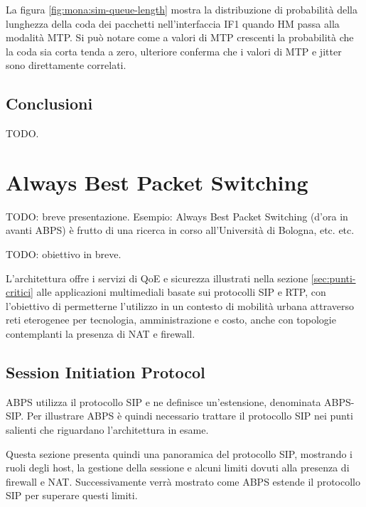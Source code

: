 \documentclass[12pt,a4paper,openright,twoside]{book}
\begin{document}
La figura \ref{fig:mona:sim-queue-length} mostra la distribuzione di
probabilità della lunghezza della coda dei pacchetti nell'interfaccia
IF1 quando HM passa alla modalità MTP. Si può notare come a valori di
MTP crescenti la probabilità che la coda sia corta tenda a zero,
ulteriore conferma che i valori di MTP e jitter sono direttamente
correlati.




\section{Conclusioni}

TODO.


\clearpage{\pagestyle{empty}\cleardoublepage}

\chapter{Always Best Packet Switching}
TODO: breve presentazione. Esempio: Always Best Packet Switching
(d'ora in avanti ABPS) è frutto di una ricerca in corso all'Università
di Bologna, etc. etc.

TODO: obiettivo in breve.

L'architettura offre i servizi di QoE e sicurezza illustrati nella
sezione \ref{sec:punti-critici} alle applicazioni multimediali basate
sui protocolli SIP e RTP, con l'obiettivo di permetterne l'utilizzo in
un contesto di mobilità urbana attraverso reti eterogenee per
tecnologia, amministrazione e costo, anche con topologie contemplanti la
presenza di NAT e firewall.

\section{Session Initiation Protocol}

ABPS utilizza il protocollo SIP e ne definisce un'estensione,
denominata ABPS-SIP. Per illustrare ABPS è quindi necessario trattare
il protocollo SIP nei punti salienti che riguardano l'architettura in
esame.

Questa sezione presenta quindi una panoramica del protocollo SIP,
mostrando i ruoli degli host, la gestione della sessione e alcuni
limiti dovuti alla presenza di firewall e NAT. Successivamente verrà
mostrato come ABPS estende il protocollo SIP per superare questi
limiti.
\end{document}
